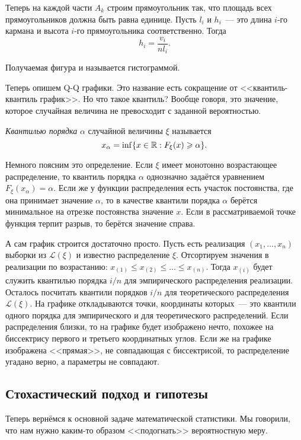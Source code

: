 Теперь на каждой части \(A_{k}\) строим прямоугольник так, что площадь всех 
прямоугольников должна быть равна единице. Пусть \(l_{i}\) и \(h_{i}\)~--- это 
длина \(i\)-го кармана и высота \(i\)-го прямоугольника соответственно. Тогда
\[
	h_{i} = \frac{v_{i}}{nl_{i}}.
\]

Получаемая фигура и называется гистограммой.

Теперь опишем Q-Q графики. Это название есть сокращение от 
<<квантиль-квантиль график>>. Но что такое квантиль? Вообще говоря, это 
значение, которое случайная величина не превосходит с заданной вероятностью. 
\begin{definition}
	\emph{Квантилью порядка} \(\alpha\) случайной величины \(\xi\) называется
	\[
		x_{\alpha} = \inf\{x \in \mathbb{R} : F_{\xi}(x) \geqslant \alpha\}.
	\]
\end{definition}

Немного поясним это определение. Если \(\xi\) имеет монотонно возрастающее 
распределение, то квантиль порядка \(\alpha\) однозначно задаётся уравнением 
\(F_{\xi}(x_{\alpha}) = \alpha\). Если же у функции распределения есть участок 
постоянства, где она принимает значение \(\alpha\), то в качестве квантили 
порядка \(\alpha\) берётся минимальное на отрезке постоянства значение \(x\). 
Если в рассматриваемой точке функция терпит разрыв, то берётся значение справа.

А сам график строится достаточно просто. Пусть есть реализация \((x_{1}, \dots, 
x_{n})\) выборки из \(\mathcal{L}(\xi)\) и известно распределение \(\xi\). 
Отсортируем значения в реализации по возрастанию: \(x_{(1)} \leq x_{(2)} \leq 
\dots \leq x_{(n)}\). Тогда \(x_{(i)}\) будет служить квантилью порядка \(i/n\) 
для эмпирического распределения реализации. Осталось посчитать квантили 
порядков \(i/n\) для теоретического распределения \(\mathcal{L}(\xi)\). На 
графике откладываются точки, координаты которых~--- это квантили одного порядка 
для эмпирического и для теоретического распределений. Если распределения 
близки, то на графике будет изображено нечто, похожее на биссектрису первого и 
третьего координатных углов. Если же на графике изображена <<прямая>>, не 
совпадающая с биссектрисой, то распределение угадано верно, а параметры не 
совпадают.

\subsection{Стохастический подход и гипотезы}
Теперь вернёмся к основной задаче математической статистики. Мы говорили, что 
нам нужно каким-то образом <<подогнать>> вероятностную меру.

